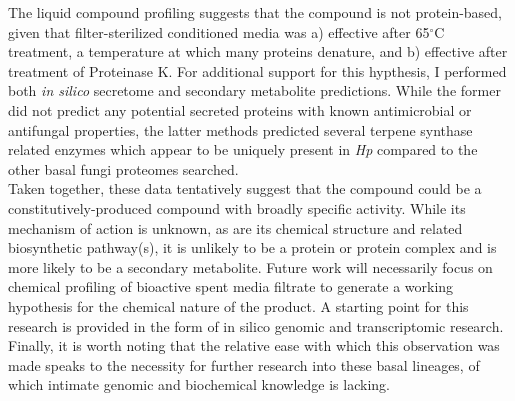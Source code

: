 \indent The liquid compound profiling suggests that the compound is not protein-based, given that filter-sterilized conditioned media was a) effective after 65$^{\circ}$C treatment, a temperature at which many proteins denature, and b) effective after treatment of Proteinase K. For additional support for this hypthesis, I performed both \textit{in silico} secretome and secondary metabolite predictions. While the former did not predict any potential secreted proteins with known antimicrobial or antifungal properties, the latter methods predicted several terpene synthase related enzymes which appear to be uniquely present in \textit{Hp} compared to the other basal fungi proteomes searched.\\
\indent Taken together, these data tentatively suggest that the compound could be a constitutively-produced compound with broadly specific activity. While its mechanism of action is unknown, as are its chemical structure and related biosynthetic pathway(s), it is unlikely to be a protein or protein complex and is more likely to be a secondary metabolite. Future work will necessarily focus on chemical profiling of bioactive spent media filtrate to generate a working hypothesis for the chemical nature of the product. A starting point for this research is provided in the form of in silico genomic and transcriptomic research. Finally, it is worth noting that the relative ease with which this observation was made speaks to the necessity for further research into these basal lineages, of which intimate genomic and biochemical knowledge is lacking.\\
